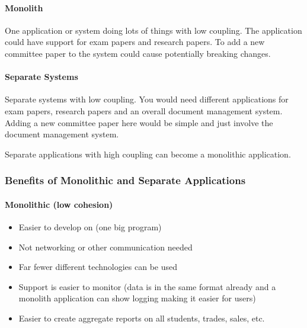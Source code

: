 \paragraph{Monolith}\label{par:monolith}

One application or system doing lots of things with low coupling.
The application could have support for exam papers and research papers.
To add a new committee paper to the system could cause potentially breaking changes.

\paragraph{Separate Systems}\label{par:separate_systems}

Separate systems with low coupling.
You would need different applications for exam papers, research papers and an overall document management system.
Adding a new committee paper here would be simple and just involve the document management system.

\begin{note}
    Separate applications with high coupling can become a monolithic application.
\end{note}

\subsubsection{Benefits of Monolithic and Separate Applications}\label{ssub:benefits_of_monolithic_and_separate_applications}

\paragraph{Monolithic (low cohesion)}\label{par:monolithic_low_cohesion_}

\begin{itemize}
    \item Easier to develop on (one big program)
    \item Not networking or other communication needed
    \item Far fewer different technologies can be used
    \item Support is easier to monitor (data is in the same format already and a monolith application can show logging making it easier for users)
    \item Easier to create aggregate reports on all students, trades, sales, etc.
\end{itemize}

